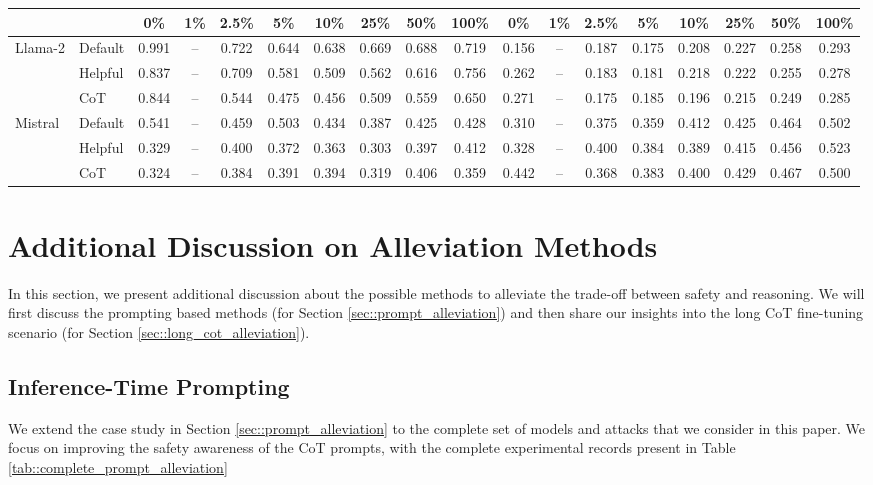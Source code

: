 \begin{table}[h]
\begin{adjustbox}{max width=1.0\textwidth}
\begin{tabular}{ll|cccccccc|cccccccc}
      & & 0\% & 1\% & 2.5\% & 5\% & 10\% & 25\% & 50\% & 100\% & 0\% & 1\% & 2.5\% & 5\% & 10\% & 25\% & 50\% & 100\% \\
      \midrule
      \multirow{3}{*}{Llama-2} 
      & Default & 0.991 & --    & 0.722 & 0.644 & 0.638 & 0.669 & 0.688 & 0.719 & 0.156 & --    & 0.187 & 0.175 & 0.208 & 0.227 & 0.258 & 0.293 \\
      & Helpful & 0.837 & --    & 0.709 & 0.581 & 0.509 & 0.562 & 0.616 & 0.756 & 0.262 & --    & 0.183 & 0.181 & 0.218 & 0.222 & 0.255 & 0.278 \\
      & CoT     & 0.844 & --    & 0.544 & 0.475 & 0.456 & 0.509 & 0.559 & 0.650 & 0.271 & --    & 0.175 & 0.185 & 0.196 & 0.215 & 0.249 & 0.285 \\
      \midrule
      \multirow{3}{*}{Mistral} 
      & Default & 0.541 & --    & 0.459 & 0.503 & 0.434 & 0.387 & 0.425 & 0.428 & 0.310 & --    & 0.375 & 0.359 & 0.412 & 0.425 & 0.464 & 0.502 \\
      & Helpful & 0.329 & --    & 0.400 & 0.372 & 0.363 & 0.303 & 0.397 & 0.412 & 0.328 & --    & 0.400 & 0.384 & 0.389 & 0.415 & 0.456 & 0.523 \\
      & CoT     & 0.324 & --    & 0.384 & 0.391 & 0.394 & 0.319 & 0.406 & 0.359 & 0.442 & --    & 0.368 & 0.383 & 0.400 & 0.429 & 0.467 & 0.500 \\
      \bottomrule
    \end{tabular}
  \end{adjustbox}
\end{table}

\clearpage

\section{Additional Discussion on Alleviation Methods}
\par In this section, we present additional discussion about the possible methods to alleviate the trade-off between safety and reasoning. We will first discuss the prompting based methods (for Section \ref{sec::prompt_alleviation}) and then share our insights into the long CoT fine-tuning scenario (for Section \ref{sec::long_cot_alleviation}).

\subsection{Inference-Time Prompting}
\label{sec::alleviate_discuss_prompt}
\par We extend the case study in Section \ref{sec::prompt_alleviation} to the complete set of models and attacks that we consider in this paper. We focus on improving the safety awareness of the CoT prompts, with the complete experimental records present in Table \ref{tab::complete_prompt_alleviation}

